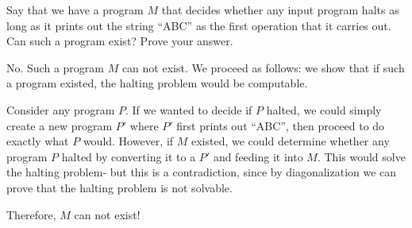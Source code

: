 \question Say that we have a program $M$ that decides whether any input 
program halts as long as it prints out the string “ABC” as the first 
operation that it carries out. Can such a program exist? Prove your answer.

 
 

 
 
\begin{solution} [1 in]
No. Such a program $M$ can not exist. We proceed as follows: we show 
that if such a program existed, the halting problem would be computable.

Consider any program $P$. If we wanted to decide if $P$ halted, we 
could simply create a new program $P'$ where $P'$ first prints out “ABC”, 
then proceed to do exactly what $P$ would. However, if $M$ existed, we 
could determine whether any program $P$ halted by converting it to a $P'$ 
and feeding it into $M$. This would solve the halting problem- but this 
is a contradiction, since by diagonalization we can prove that the 
halting problem is not solvable.

Therefore, $M$ can not exist!  
\end{solution}